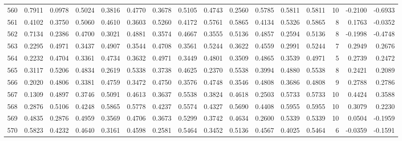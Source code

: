 \begin{tabular}{lrrrrrrrrrrrrrrr}
560 &      0.7911 &  0.0978 &  0.5024 &  0.3816 &  0.4770 &  0.3678 &  0.5105 &  0.4743 &  0.2560 &  0.5785 &   0.5811 &     0.5811 &     10 &                   -0.2100 &                    -0.6933 \\
561 &      0.4102 &  0.3750 &  0.5060 &  0.4610 &  0.3603 &  0.5260 &  0.4172 &  0.5761 &  0.5865 &  0.4134 &   0.5326 &     0.5865 &      8 &                    0.1763 &                    -0.0352 \\
562 &      0.7134 &  0.2386 &  0.4700 &  0.3021 &  0.4881 &  0.3574 &  0.4667 &  0.3555 &  0.5136 &  0.4857 &   0.2594 &     0.5136 &      8 &                   -0.1998 &                    -0.4748 \\
563 &      0.2295 &  0.4971 &  0.3437 &  0.4907 &  0.3544 &  0.4708 &  0.3561 &  0.5244 &  0.3622 &  0.4559 &   0.2991 &     0.5244 &      7 &                    0.2949 &                     0.2676 \\
564 &      0.2232 &  0.4704 &  0.3361 &  0.4734 &  0.3632 &  0.4971 &  0.3449 &  0.4801 &  0.3509 &  0.4865 &   0.3539 &     0.4971 &      5 &                    0.2739 &                     0.2472 \\
565 &      0.3117 &  0.5206 &  0.4834 &  0.2619 &  0.5338 &  0.3738 &  0.4625 &  0.2370 &  0.5538 &  0.3994 &   0.4880 &     0.5538 &      8 &                    0.2421 &                     0.2089 \\
566 &      0.2020 &  0.4806 &  0.3381 &  0.4759 &  0.3472 &  0.4750 &  0.3576 &  0.4748 &  0.3546 &  0.4808 &   0.3686 &     0.4808 &      9 &                    0.2788 &                     0.2786 \\
567 &      0.1309 &  0.4897 &  0.3746 &  0.5091 &  0.4613 &  0.3637 &  0.5538 &  0.3824 &  0.4618 &  0.2503 &   0.5733 &     0.5733 &     10 &                    0.4424 &                     0.3588 \\
568 &      0.2876 &  0.5106 &  0.4248 &  0.5865 &  0.5778 &  0.4237 &  0.5574 &  0.4327 &  0.5690 &  0.4408 &   0.5955 &     0.5955 &     10 &                    0.3079 &                     0.2230 \\
569 &      0.4835 &  0.2876 &  0.4959 &  0.3569 &  0.4706 &  0.3673 &  0.5299 &  0.3742 &  0.4634 &  0.2600 &   0.5339 &     0.5339 &     10 &                    0.0504 &                    -0.1959 \\
570 &      0.5823 &  0.4232 &  0.4640 &  0.3161 &  0.4598 &  0.2581 &  0.5464 &  0.3452 &  0.5136 &  0.4567 &   0.4025 &     0.5464 &      6 &                   -0.0359 &                    -0.1591 \\

\end{tabular}
